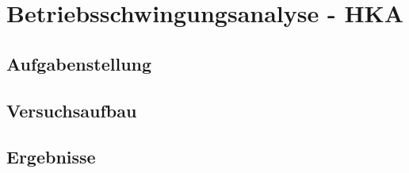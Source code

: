 \chapter{Betriebsschwingungsanalyse - HKA}
\label{sec: Hauptkapitel 3}

\section{Aufgabenstellung}

\section{Versuchsaufbau}

\section{Ergebnisse}